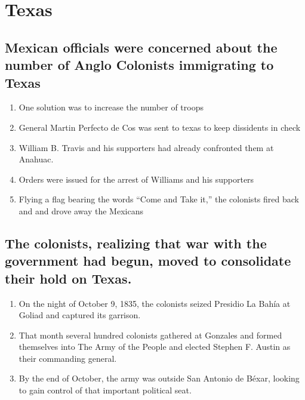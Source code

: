\documentclass{scrartcl}
\begin{document}
\section{Texas}
\label{sec:org848ef65}
\subsection{Mexican officials were concerned about the number of Anglo Colonists immigrating to Texas}
\label{sec:org6fa8292}
\begin{enumerate}
\item One solution was to increase the number of troops
\item General Martin Perfecto de Cos was sent to texas to keep dissidents in check
\item William B. Travis and his supporters had already confronted them at Anahuac.
\item Orders were issued for the arrest of Williams and his supporters
\item Flying a flag bearing the words “Come and Take it,” the colonists fired
back and and drove away the Mexicans
\end{enumerate}
\subsection{The colonists, realizing that war with the government had begun, moved to consolidate their hold on Texas.}
\label{sec:orgc0ae248}
\begin{enumerate}
\item On the night of October 9, 1835, the colonists seized Presidio La Bahía at Goliad and captured its garrison.
\item That month several hundred colonists gathered at Gonzales and formed
themselves into The Army of the People and elected Stephen F. Austin as
their commanding general.
\item By the end of October, the army was outside San Antonio de Béxar,
looking to gain control of that important political seat.
\end{enumerate}
\end{document}
